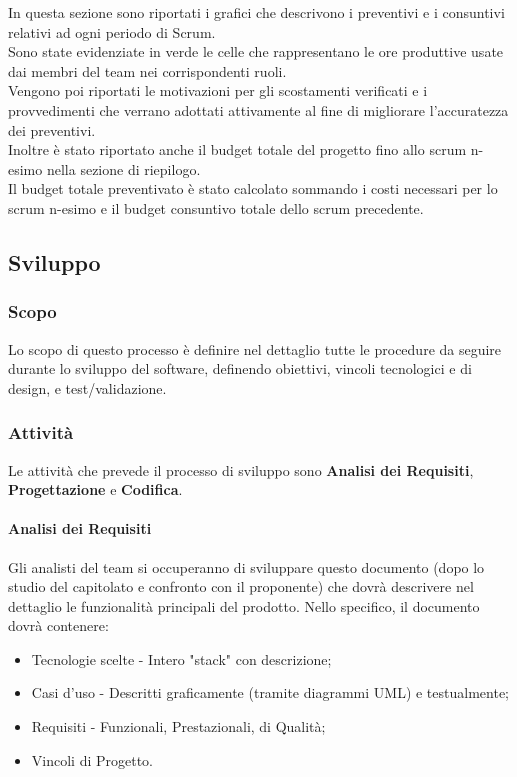 In questa sezione sono riportati i grafici che descrivono i preventivi e i consuntivi relativi ad ogni periodo di Scrum.\\
Sono state evidenziate in verde le celle che rappresentano le ore produttive usate dai membri del team nei corrispondenti ruoli.\\       
Vengono poi riportati le motivazioni per gli scostamenti verificati e i provvedimenti che verrano adottati attivamente al fine di migliorare l'accuratezza dei preventivi.\\
Inoltre è stato riportato anche il budget totale del progetto fino allo scrum n-esimo nella sezione di riepilogo.\\
Il budget totale preventivato è stato calcolato sommando i costi necessari per lo scrum n-esimo e il budget consuntivo totale dello scrum precedente.\\


\subsection{Sviluppo}

\subsubsection{Scopo}
Lo scopo di questo processo è definire nel dettaglio tutte le procedure da seguire durante lo sviluppo del software, definendo obiettivi, vincoli tecnologici e di design, e test/validazione.

\subsubsection{Attività}
Le attività che prevede il processo di sviluppo sono \textbf{Analisi dei Requisiti}, \textbf{Progettazione} e \textbf{Codifica}.

\paragraph{Analisi dei Requisiti}
Gli analisti del team si occuperanno di sviluppare questo documento (dopo lo studio del capitolato e confronto con il proponente) che dovrà descrivere nel dettaglio le funzionalità principali del prodotto. Nello specifico, il documento dovrà contenere:
\begin{itemize}
\setlength\itemsep{0.1em}
    \item Tecnologie scelte - Intero "stack" con descrizione;
    \item Casi d'uso - Descritti graficamente (tramite diagrammi UML) e testualmente;
    \item Requisiti - Funzionali, Prestazionali, di Qualità;
    \item Vincoli di Progetto.
\end{itemize}

